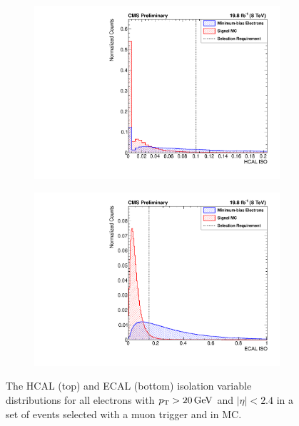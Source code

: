 \begin{figure}[!htbp]
    \centering
    \begin{subfigure}[b]{\StackedPlotWidth}
        \includegraphics[width=\textwidth]{figures/e_reco_var_hcal_iso.pdf}
        \caption{}
        \label{fig:hcal_iso}
    \end{subfigure}
    \begin{subfigure}[b]{\StackedPlotWidth}
        \includegraphics[width=\textwidth]{figures/e_reco_var_ecal_iso.pdf}
        \caption{}
        \label{fig:ecal_iso}
    \end{subfigure}
    \caption[
        Distributions of HCAL and ECAL isolation variables in data and MC.
    ]{
        The HCAL (top) and ECAL (bottom) isolation variable distributions for
        all electrons with $p_{\mathrm{T}} > 20 \,\text{Ge\hspace{-.08em}V}$ and $|\eta| < 2.4$ in a set of
        events selected with a muon trigger and in \MADGRAPH \Ztoee MC.
    }
    \label{fig:hcal_ecal_isos}
\end{figure}

